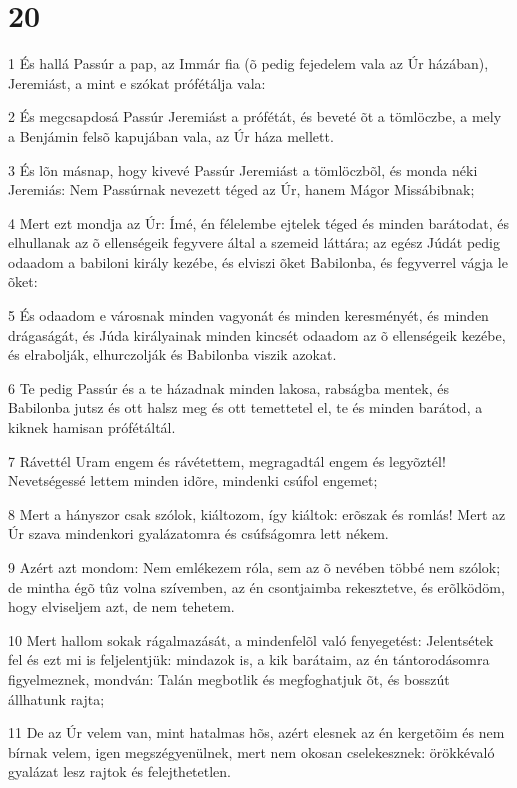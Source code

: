 \chapter{20}

\par 1 És hallá Passúr a pap, az Immár fia (õ pedig fejedelem vala az Úr házában), Jeremiást, a mint e szókat prófétálja vala:
\par 2 És megcsapdosá Passúr Jeremiást a prófétát, és beveté õt a tömlöczbe, a mely a Benjámin felsõ kapujában vala, az Úr háza mellett.
\par 3 És lõn másnap, hogy kivevé Passúr Jeremiást a tömlöczbõl, és monda néki Jeremiás: Nem Passúrnak nevezett téged az Úr, hanem Mágor Missábibnak;
\par 4 Mert ezt mondja az Úr: Ímé, én félelembe ejtelek téged és minden barátodat, és elhullanak az õ ellenségeik fegyvere által a szemeid láttára; az egész Júdát pedig odaadom a babiloni király kezébe, és elviszi õket Babilonba, és fegyverrel vágja le õket:
\par 5 És odaadom e városnak minden vagyonát és minden keresményét, és minden drágaságát, és Júda királyainak minden kincsét odaadom az õ ellenségeik kezébe, és elrabolják, elhurczolják és Babilonba viszik azokat.
\par 6 Te pedig Passúr és a te házadnak minden lakosa, rabságba mentek, és Babilonba jutsz és ott halsz meg és ott temettetel el, te és minden barátod, a kiknek hamisan prófétáltál.
\par 7 Rávettél Uram engem és rávétettem, megragadtál engem és legyõztél! Nevetségessé lettem minden idõre, mindenki csúfol engemet;
\par 8 Mert a hányszor csak szólok, kiáltozom, így kiáltok: erõszak és romlás! Mert az Úr szava mindenkori gyalázatomra és csúfságomra lett nékem.
\par 9 Azért azt mondom: Nem emlékezem róla, sem az õ nevében többé nem szólok; de mintha égõ tûz volna szívemben, az én csontjaimba rekesztetve, és erõlködöm, hogy elviseljem azt, de nem tehetem.
\par 10 Mert hallom sokak rágalmazását, a mindenfelõl való fenyegetést: Jelentsétek fel és ezt mi is feljelentjük: mindazok is, a kik barátaim, az én tántorodásomra figyelmeznek, mondván: Talán megbotlik és megfoghatjuk õt, és bosszút állhatunk rajta;
\par 11 De az Úr velem van, mint hatalmas hõs, azért elesnek az én kergetõim és nem bírnak velem, igen megszégyenülnek, mert nem okosan cselekesznek: örökkévaló  gyalázat lesz rajtok és felejthetetlen.
